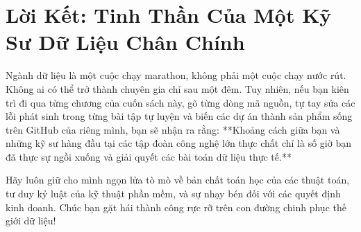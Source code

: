 \section{Lời Kết: Tinh Thần Của Một Kỹ Sư Dữ Liệu Chân Chính}

Ngành dữ liệu là một cuộc chạy marathon, không phải một cuộc chạy nước rút. Không ai có thể trở thành chuyên gia chỉ sau một đêm. Tuy nhiên, nếu bạn kiên trì đi qua từng chương của cuốn sách này, gõ từng dòng mã nguồn, tự tay sửa các lỗi phát sinh trong từng bài tập tự luyện và biến các dự án thành sản phẩm sống trên GitHub của riêng mình, bạn sẽ nhận ra rằng: **Khoảng cách giữa bạn và những kỹ sư hàng đầu tại các tập đoàn công nghệ lớn thực chất chỉ là số giờ bạn đã thực sự ngồi xuống và giải quyết các bài toán dữ liệu thực tế.**

Hãy luôn giữ cho mình ngọn lửa tò mò về bản chất toán học của các thuật toán, tư duy kỷ luật của kỹ thuật phần mềm, và sự nhạy bén đối với các quyết định kinh doanh. Chúc bạn gặt hái thành công rực rỡ trên con đường chinh phục thế giới dữ liệu!
